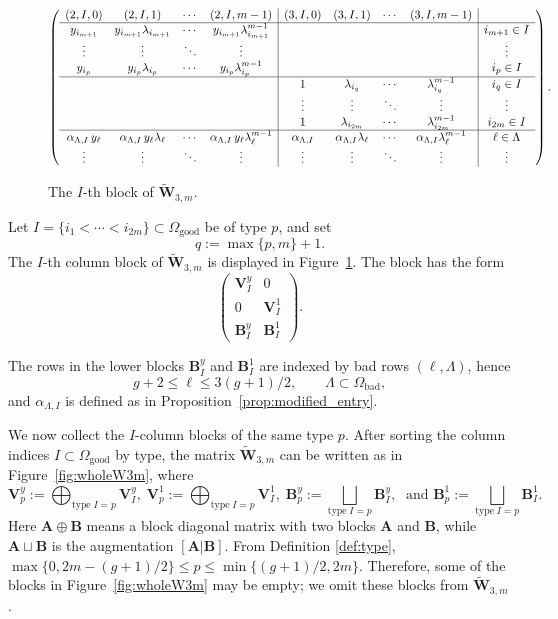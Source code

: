 \documentclass[12pt, letterpaper]{amsart}
\theoremstyle{definition}
\newcommand{\bA}{\mathbf{A} }
\newcommand{\bB}{\mathbf{B} }
\newcommand{\bV}{\mathbf{V} }
\newcommand{\bW}{\mathbf{W} }
\newcommand{\Om}{\Omega}
\newcommand{\lbd}{\lambda}
\begin{document}
\begin{figure}[!ht]
\[
\left( \begin{array}{cccc|cccc|c}
  (2,I,0) & (2,I,1) & \cdots & (2,I,m-1) & (3,I,0) & (3,I,1) & \cdots & (3,I,m-1) & \\
  \hline y_{i_{m+1}} & y_{i_{m+1}}\lbd_{i_{m+1}} & \cdots & y_{i_{m+1}}\lbd_{i_{m+1}}^{m-1}&&&&& i_{m+1}\in I\\
  \vdots & \vdots & \ddots & \vdots&&&&& \vdots\\
  y_{i_p} & y_{i_p}\lbd_{i_p} & \cdots & y_{i_p}\lbd_{i_p}^{m-1}&&&&& i_p\in I\\
  \hline &&&&1 & \lbd_{i_q} & \cdots & \lbd_{i_q}^{m-1} & i_q\in I\\
  &&&&\vdots & \vdots & \ddots & \vdots & \vdots\\
  &&&&1 & \lbd_{i_{2m}} & \cdots & \lbd_{i_{2m}}^{m-1} & i_{2m}\in I\\
  \hline \alpha_{\Lambda,I}\,y_\ell & \alpha_{\Lambda,I}\,y_\ell\lbd_\ell & \cdots & \alpha_{\Lambda,I}\,y_\ell\lbd_\ell^{m-1} & \alpha_{\Lambda,I} & \alpha_{\Lambda,I}\lbd_\ell & \cdots & \alpha_{\Lambda,I}\lbd_\ell^{m-1} & \ell\in\Lambda\\
  \vdots & \vdots & \ddots & \vdots & \vdots & \vdots & \ddots & \vdots & \vdots
\end{array} \right).
\]
\caption{The \(I\)-th block of \(\widetilde{\bW}_{3,m}\).} \label{fig:Iblock}
\end{figure}

Let \(I=\{i_1<\cdots<i_{2m}\}\subset\Om_{\mathrm{good}}\) be of type \(p\), and set
\[q:=\max\{p,m\}+1.\]
The \(I\)-th column block of \(\widetilde{\bW}_{3,m}\) is displayed in Figure~\ref{fig:Iblock}. The block has the form
\[
\begin{pmatrix}
  \bV_{I}^y & 0\\
  0 & \bV_{I}^1\\
  \bB_{I}^y & \bB_{I}^1
\end{pmatrix}.
\]

The rows in the lower blocks \(\bB_{I}^y\) and \(\bB_{I}^1\) are indexed by bad rows \((\ell,\Lambda)\), hence
\[g+2\le \ell\le3(g+1)/2,\qquad\Lambda\subset\Om_{\mathrm{bad}},\]
and \(\alpha_{\Lambda,I}\) is defined as in Proposition~\ref{prop:modified_entry}.

We now collect the \(I\)-column blocks of the same type \(p\). After sorting the column indices \(I\subset\Om_{\mathrm{good}}\) by type, the matrix \(\widetilde{\bW}_{3,m}\) can be written as in Figure~\ref{fig:wholeW3m}, where
\[
\bV_p^y := \bigoplus_{\mathrm{type}\;I = p}\bV_{I}^y, \;\bV_p^1 := \bigoplus_{\mathrm{type}\;I = p} \bV_{I}^1,\; \bB_p^y := \bigsqcup_{\mathrm{type}\;I = p} \bB_{I}^y,\; \mbox{ and } \bB_p^1 := \bigsqcup_{\mathrm{type}\;I = p} \bB_{I}^1.
\]
Here \(\bA \oplus \bB\) means a block diagonal matrix with two blocks \(\bA\) and \(\bB\), while \(\bA \sqcup \bB\) is the augmentation \([\bA| \bB]\). From Definition \ref{def:type}, \(\max\{0, 2m - (g+1)/2\} \le p \le \min\{(g+1)/2, 2m\}\). Therefore, some of the blocks in Figure~\ref{fig:wholeW3m} may be empty; we omit these blocks from \(\widetilde{\bW}_{3,m}\).
\end{document}
